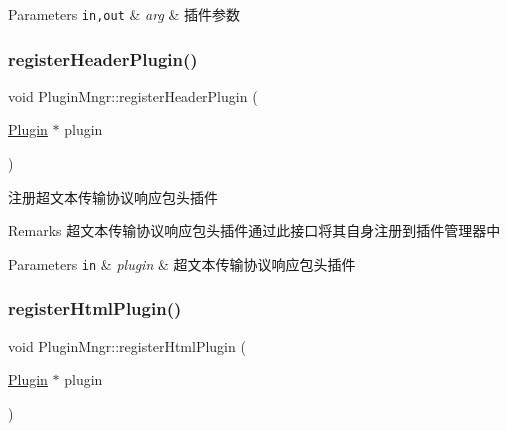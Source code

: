\begin{DoxyParams}[1]{Parameters}
\mbox{\tt in,out}  & {\em arg} & 插件参数 \\
\hline
\end{DoxyParams}
\mbox{\label{class_plugin_mngr_a4b1e91927684b2f976ca97fb441baeb7}} 
\subsubsection{\texorpdfstring{register\+Header\+Plugin()}{registerHeaderPlugin()}}
{\footnotesize\ttfamily void Plugin\+Mngr\+::register\+Header\+Plugin (\begin{DoxyParamCaption}\item[{\hyperlink{class_plugin}{Plugin} $\ast$}]{plugin }\end{DoxyParamCaption})}



注册超文本传输协议响应包头插件 

\begin{DoxyRemark}{Remarks}
超文本传输协议响应包头插件通过此接口将其自身注册到插件管理器中 
\end{DoxyRemark}

\begin{DoxyParams}[1]{Parameters}
\mbox{\tt in}  & {\em plugin} & 超文本传输协议响应包头插件 \\
\hline
\end{DoxyParams}
\mbox{\label{class_plugin_mngr_a27dbc387de2030fbdf6df8e61922a340}} 
\subsubsection{\texorpdfstring{register\+Html\+Plugin()}{registerHtmlPlugin()}}
{\footnotesize\ttfamily void Plugin\+Mngr\+::register\+Html\+Plugin (\begin{DoxyParamCaption}\item[{\hyperlink{class_plugin}{Plugin} $\ast$}]{plugin }\end{DoxyParamCaption})}



